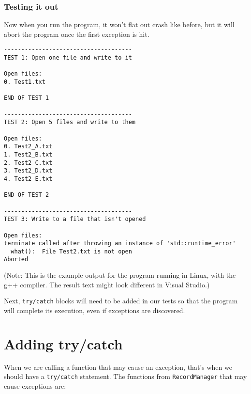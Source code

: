 \documentclass[a4paper,12pt]{book}
\begin{document}
            \hrulefill
            \subsubsection*{Testing it out}

            Now when you run the program, it won't flat out crash like
            before, but it will abort the program once the first exception
            is hit.

\begin{framed}
\begin{lstlisting}[style=output]
-------------------------------------
TEST 1: Open one file and write to it

Open files: 
0. Test1.txt

END OF TEST 1

-------------------------------------
TEST 2: Open 5 files and write to them

Open files: 
0. Test2_A.txt
1. Test2_B.txt
2. Test2_C.txt
3. Test2_D.txt
4. Test2_E.txt

END OF TEST 2

-------------------------------------
TEST 3: Write to a file that isn't opened

Open files: 
terminate called after throwing an instance of 'std::runtime_error'
  what():  File Test2.txt is not open
Aborted
\end{lstlisting}
\footnotesize (Note: This is the example output for the program running in Linux,
with the g++ compiler. The result text might look different in Visual Studio.)
\end{framed}

            Next, \texttt{try/catch} blocks will need to be added
            in our tests so that the program will complete its execution,
            even if exceptions are discovered.

        \newpage
        \section*{Adding try/catch}

            When we are calling a function that may cause an exception,
            that's when we should have a \texttt{try/catch} statement.
            The functions from \texttt{RecordManager} that may cause
            exceptions are:
\end{document}
